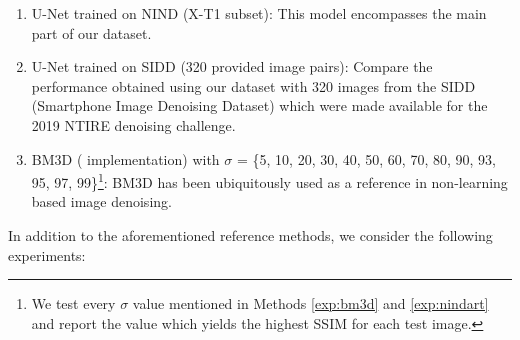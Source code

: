 \documentclass[10pt,twocolumn,letterpaper]{article}
\begin{document}
\begin{enumerate}
\itemsep0em 
  \item\label{exp:nindxt1} U-Net trained on NIND (X-T1 subset):\newline
  This model encompasses the main part of our dataset.
  \item\label{exp:sidd} U-Net trained on SIDD (320 provided image pairs):\newline
  Compare the performance obtained using our dataset with 320 images from the SIDD (Smartphone Image Denoising Dataset) \cite{sidd} which were made available for the 2019 NTIRE denoising challenge.
  \item\label{exp:bm3d} BM3D \cite{bm3d} ( \cite{bm3d-gpu} implementation) with $\sigma$ = \{5, 10, 20, 30, 40, 50, 60, 70, 80, 90, 93, 95, 97, 99\}\footnote{\label{sigmanote}We test every $\sigma$ value mentioned in Methods \ref{exp:bm3d} and \ref{exp:nindart} and report the value which yields the highest SSIM for each test image.}:\newline
  BM3D has been ubiquitously used as a reference in non-learning based image denoising.
\end{enumerate}
In addition to the aforementioned reference methods, we consider the following experiments:
\end{document}

